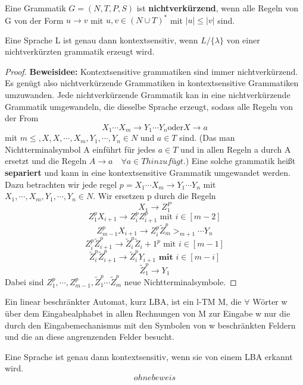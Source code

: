     Eine Grammatik \(G = (N, T, P, S)\) ist \textbf{nichtverkürzend}, wenn alle Regeln von G von der Form \(u \to v\) mit \(u,v \in (N \cup T)^* \) mit \(|u| \leq |v|\) sind.

    Eine Sprache L ist genau dann kontextsensitiv, wenn \(L / \{\lambda\}\) von einer nichtverkürzten grammatik erzeugt wird.
    \begin{proof}
        \textbf{Beweisidee: } Kontextsensitive grammatiken sind immer nichtverkürzend. Es genügt also nichtverkürzende Grammatiken in kontextsensitive Grammatiken umzuwanden. Jede nichtverkürzende Grammatik kan in eine nichtverkürzende Grammatik umgewandeln, die dieselbe Sprache erzeugt, sodass alle Regeln von der From 
        \[
            X_1 \cdots X_m \to Y_1 \cdots Y_n \text{oder} X \to a   
        \]
        mit \(m\leq, X, X,\cdots,X_m, Y_1,\cdots, Y_n \in N\) und \(a \in T\) sind. (Das man Nichtterminalsymbol A einführt für jedes \(a \in T\) und in allen Regeln a durch A ersetzt und die Regeln \(A \to a \quad \forall a \in T hinzufügt\).) Eine solche grammatik heißt \textbf{separiert} und kann in eine kontextsensitive Grammatik umgewandet werden. Dazu betrachten wir jede regel \(p = X_1 \cdots X_m \to Y_1\cdots Y_n\) mit \(X_1,\cdots, X_m, Y_1, \cdots, Y_n \in N\). Wir ersetzen p durch die Regeln 
        \[
            X_1 \to Z_1^P
        \]
        \[
            Z_1^p X_{i+1} \to Z_i^p Z_{i+1}^p \text{ mit } i \in [m-2]    
        \]
        \[
              Z_{m-1}^p X_{i+1} \to Z_i^p \tilde{Z}^p_{m}>_{m+1}\cdots Y_n
        \]
        \[
            Z_i^p \tilde{Z}_{i+1}^p \to \tilde{Z}_i^p \tilde{Z}_i+1^p \text{ mit } i \in [m-1]   
        \]
        \[
            \tilde{Z}_i^p \tilde{Z}_{i+1}^p \to \tilde{Z}_i^p Y_{i+1} \textbf{ mit } i \in [m-i]
        \]
        \[
            \tilde{Z}_1^p \to Y_1    
        \]
        Dabei sind \(Z_1^p,\cdots, Z_{m-1}^p, \tilde{Z}^p_1 \cdots \tilde{Z}_m^p\) neue Nichtterminalsymbole.
    \end{proof} 

    Ein linear beschränkter Automat, kurz LBA, ist ein l-TM M, die \(\forall\) Wörter w über dem Eingabealphabet in allen Rechnungen von M zur Eingabe w nur die durch den Eingabemechanismus mit den Symbolen von w beschränkten Feldern und die an diese angrenzenden Felder besucht.

    Eine Sprache ist genau dann kontextsensitiv, wenn sie von einem LBA erkannt wird. \[ohne beweis\]


